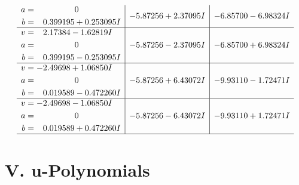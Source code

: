 \documentclass[1p]{elsarticle_modified}
\theoremstyle{definition}
\begin{document}
$$\begin{array}{c|c|c}
\begin{aligned}
a &= \phantom{-0.000000 } 0 \\
b &= \phantom{-}0.399195 + 0.253095 I\end{aligned}
 & -5.87256 + 2.37095 I & -6.85700 - 6.98324 I \\ \hline\begin{aligned}
v &= \phantom{-}2.17384 - 1.62819 I \\
a &= \phantom{-0.000000 } 0 \\
b &= \phantom{-}0.399195 - 0.253095 I\end{aligned}
 & -5.87256 - 2.37095 I & -6.85700 + 6.98324 I \\ \hline\begin{aligned}
v &= -2.49698 + 1.06850 I \\
a &= \phantom{-0.000000 } 0 \\
b &= \phantom{-}0.019589 - 0.472260 I\end{aligned}
 & -5.87256 + 6.43072 I & -9.93110 - 1.72471 I \\ \hline\begin{aligned}
v &= -2.49698 - 1.06850 I \\
a &= \phantom{-0.000000 } 0 \\
b &= \phantom{-}0.019589 + 0.472260 I\end{aligned}
 & -5.87256 - 6.43072 I & -9.93110 + 1.72471 I\\
 \hline 
 \end{array}$$\newpage
\newpage\renewcommand{\arraystretch}{1}
\centering \section*{ V. u-Polynomials}
\end{document}
